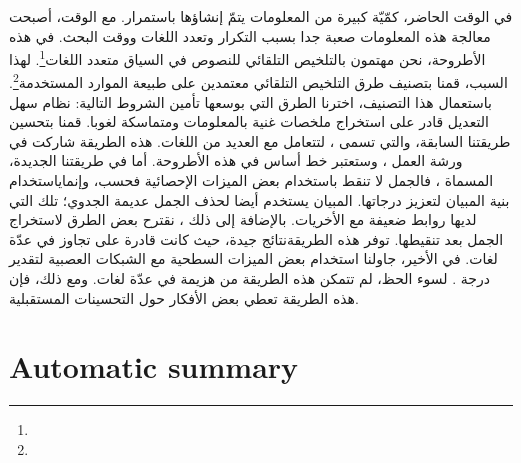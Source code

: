 \begin{arab}
	في الوقت الحاضر، كمّيّة كبيرة من المعلومات يتمّ إنشاؤها باستمرار.
	مع الوقت، أصبحت معالجة هذه المعلومات صعبة جدا بسبب التكرار وتعدد اللغات ووقت البحث.
	في هذه الأطروحة، نحن مهتمون بالتلخيص التلقائي للنصوص في السياق متعدد اللغات\footnote{}.
لهذا السبب، قمنا بتصنيف طرق التلخيص التلقائي معتمدين على طبيعة الموارد المستخدمة\footnote{}.
باستعمال هذا التصنيف، اخترنا الطرق التي بوسعها تأمين الشروط التالية: نظام سهل التعديل قادر على استخراج ملخصات غنية بالمعلومات ومتماسكة لغوبا.
قمنا بتحسين طريقتنا السابقة، والتي تسمى ، لتتعامل مع العديد من اللغات.
هذه الطريقة شاركت في ورشة العمل  ، وستعتبر خط أساس في هذه الأطروحة.
أما في طريقتنا الجديدة، المسماة  ، فالجمل لا تنقط باستخدام بعض الميزات الإحصائية فحسب، وإنماياستخدام بنية المبيان لتعزيز درجاتها.
المبيان يستخدم أيضا لحذف الجمل عديمة الجدوي؛ تلك التي لديها روابط ضعيفة مع الأخريات.
بالإضافة إلى ذلك ، نقترح بعض الطرق لاستخراج الجمل بعد تنقيطها.
توفر  هذه الطريقةنتائج جيدة، حيث كانت قادرة على تجاوز   في عدّة لغات.
في الأخير، جاولنا استخدام بعض الميزات السطحية مع الشبكات العصبية لتقدير درجة .
لسوء الحظ، لم تتمكن هذه الطريقة من هزيمة    في عدّة لغات.
ومع ذلك، فإن هذه الطريقة تعطي بعض الأفكار حول التحسينات المستقبلية.
\end{arab}



\chapter*{Automatic summary}

